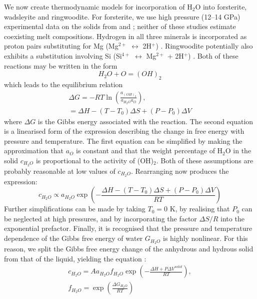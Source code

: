 \documentclass[review]{elsarticle}
\begin{document}
We now create thermodynamic models for incorporation of H$_2$O into forsterite, wadsleyite and ringwoodite. For forsterite, we use high pressure (12--14 GPa) experimental data on the solids from \cite{SFNHB2006} and \cite{LSKO2009}; neither of these studies estimate coexisting melt compositions. Hydrogen in all three minerals is incorporated as proton pairs substituting for Mg (Mg$^{2+}$ $\leftrightarrow$ 2H$^{+}$) \citep{Smyth1987, SHFJLM2003}. Ringwoodite potentially also exhibits a substitution involving Si (Si$^{4+}$ $\leftrightarrow$ Mg$^{2+}$ + 2H$^{+}$) \citep{KKMO2000}. Both of these reactions may be written in the form 
\begin{equation}
H_2O + O = (OH)_2
\end{equation}
which leads to the equilibrium relation 
\begin{eqnarray}
\Delta G = -R T \ln \left( \frac{a_{(OH)_2}}{a_{H_2O}a_{O}} \right), \\
= \Delta H - (T-T_0) \Delta S + (P-P_0) \Delta V
\end{eqnarray}
where $\Delta G$ is the Gibbs energy associated with the reaction. The second equation is a linearised form of the expression describing the change in free energy with pressure and temperature. The first equation can be simplified by making the approximation that $a_O$ is constant and that the weight percentage of H$_2$O in the solid $c_{H_2O}$ is proportional to the activity of (OH)$_2$. Both of these assumptions are probably reasonable at low values of $c_{H_2O}$. Rearranging now produces the expression:
\begin{equation}
c_{H_2O} \propto a_{H_2O} \exp{ \left( -\frac{\Delta H - (T-T_0) \Delta S + (P-P_0) \Delta V}{R T} \right) }
\end{equation}
Further simplifications can be made by taking $T_0 = 0$ K, by realising that $P_0$ can be neglected at high pressures, and by incorporating the factor $\Delta S/R$ into the exponential prefactor. Finally, it is recognised that the pressure and temperature dependence of the Gibbs free energy of water $G_{H_2O}$ is highly nonlinear. For this reason, we split the Gibbs free energy change of the anhydrous and hydrous solid from that of the liquid, yielding the equation \citep{KB2006}:
\begin{eqnarray}
c_{H_2O} = A a_{H_2O} f_{H_2O} \exp{ \left( -\frac{\Delta H + P \Delta V^{solid}}{R T} \right) }, \\
f_{H_2O} = \exp \left(\frac{\Delta G_{H_2O}}{RT} \right)
\end{eqnarray}
\end{document}
